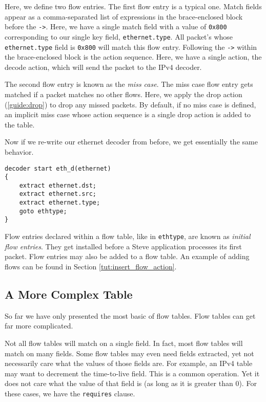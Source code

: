 Here, we define two flow entries. The first flow entry is a typical one. Match fields appear as a comma-separated list of expressions in the brace-enclosed block before the \texttt{->}. Here, we have a single match field with a value of \texttt{0x800} corresponding to our single key field, \texttt{ethernet.type}. All packet's whose \texttt{ethernet.type} field is \texttt{0x800} will match this flow entry. Following the \texttt{->} within the brace-enclosed block is the action sequence. Here, we have a single action, the decode action, which will send the packet to the IPv4 decoder.

The second flow entry is known as the \textit{miss case}. The miss case flow entry gets matched if a packet matches no other flows. Here, we apply the drop action (\ref{guide:drop}) to drop any missed packets. By default, if no miss case is defined, an implicit miss case whose action sequence is a single drop action is added to the table.

Now if we re-write our ethernet decoder from before, we get essentially the same behavior.

\begin{codepage}
\begin{lstlisting}
decoder start eth_d(ethernet)
{
	extract ethernet.dst;
	extract ethernet.src;
	extract ethernet.type;
	goto ethtype;
}
\end{lstlisting}
\end{codepage}

Flow entries declared within a flow table, like in \texttt{ethtype}, are known as \textit{initial flow entries}. They get installed before a Steve application processes its first packet. Flow entries may also be added to a flow table. An example of adding flows can be found in Section \ref{tut:insert_flow_action}.

\subsection{A More Complex Table} \label{tut:complex_table}

So far we have only presented the most basic of flow tables. Flow tables can get far more complicated.

Not all flow tables will match on a single field. In fact, most flow tables will match on many fields. Some flow tables may even need fields extracted, yet not necessarily care what the values of those fields are. For example, an IPv4 table may want to decrement the time-to-live field. This is a common operation. Yet it does not care what the value of that field is (as long as it is greater than 0). For these cases, we have the \texttt{requires} clause.

